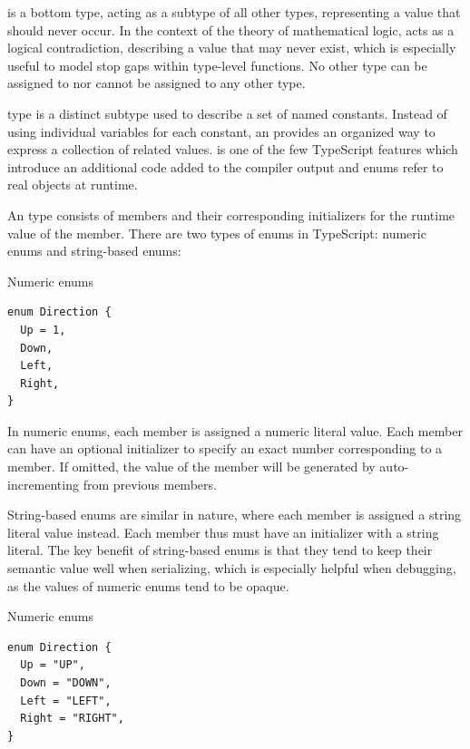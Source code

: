 
 is a bottom type, acting as a subtype of all other types, representing a value that should never occur. In the context of the theory of mathematical logic,  acts as a logical contradiction, describing a value that may never exist, which is especially useful to model stop gaps within type-level functions. No other type can be assigned to  nor  cannot be assigned to any other type.


 type is a distinct subtype used to describe a set of named constants. Instead of using individual variables for each constant, an  provides an organized way to express a collection of related values.  is one of the few TypeScript features which introduce an additional code added to the compiler output and enums refer to real objects at runtime.

An  type consists of members and their corresponding initializers for the runtime value of the member. There are two types of enums in TypeScript: numeric enums and string-based enums:

\begin{listing}[h]
  \caption{Numeric enums}
  \begin{verbatim}
enum Direction {
  Up = 1,
  Down,
  Left,
  Right,
}
\end{verbatim}
\end{listing}

In numeric enums, each member is assigned a numeric literal value. Each member can have an optional initializer to specify an exact number corresponding to a member. If omitted, the value of the member will be generated by auto-incrementing from previous members.

String-based enums are similar in nature, where each member is assigned a string literal value instead. Each member thus must have an initializer with a string literal. The key benefit of string-based enums is that they tend to keep their semantic value well when serializing, which is especially helpful when debugging, as the values of numeric enums tend to be opaque.

\begin{listing}[h]
  \caption{Numeric enums}
  \begin{verbatim}
enum Direction {
  Up = "UP",
  Down = "DOWN",
  Left = "LEFT",
  Right = "RIGHT",
}
\end{verbatim}
\end{listing}

